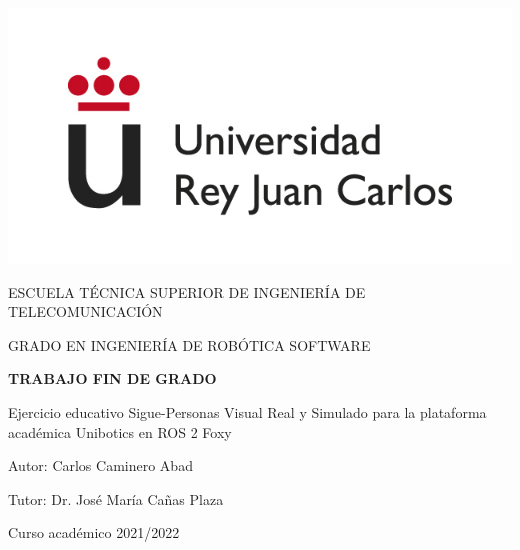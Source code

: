 \thispagestyle{empty}

\begin{titlepage}
	\begin{center}
		\vspace*{3mm}
		\begin{center}
			\includegraphics[width=0.4\linewidth]{imagenes/logo.jpg}
		\end{center}
		\vspace{6.0mm}
		
		\fontsize{15.5}{14}\selectfont ESCUELA TÉCNICA SUPERIOR DE INGENIERÍA DE TELECOMUNICACIÓN
		\vspace{13mm}
		
		\fontsize{14}{14}\selectfont GRADO EN INGENIERÍA DE ROBÓTICA SOFTWARE
		
		\vspace{70pt}
		
		\fontsize{15.7}{14}\selectfont \textbf{TRABAJO FIN DE GRADO} 
		
		\vspace{20mm}
		\begin{LARGE}
			Ejercicio educativo Sigue-Personas Visual Real y Simulado para la plataforma académica Unibotics en ROS 2 Foxy
		\end{LARGE}
		
		\vspace{20mm}
		
		\begin{large}
			Autor: Carlos Caminero Abad
			
			Tutor: Dr. José María Cañas Plaza
			
			\vspace{10mm}
		\end{large}
		\begin{normalsize}
			Curso académico 2021/2022		
		\end{normalsize}
		\vspace{10mm}
		
	\end{center}
	
\end{titlepage}

\thispagestyle{empty}